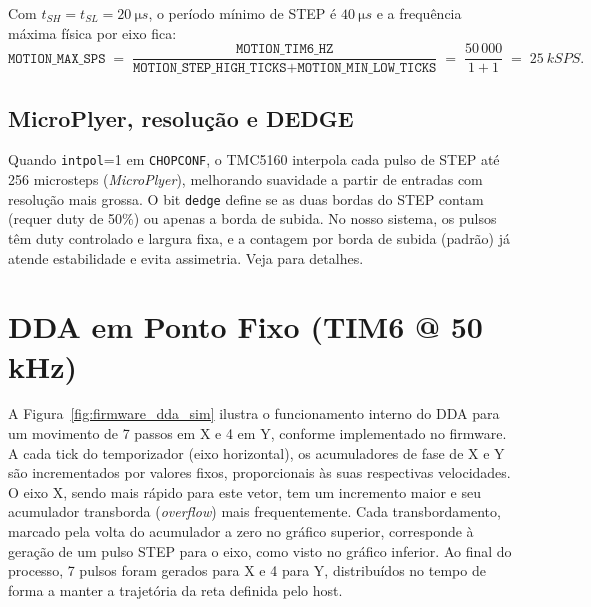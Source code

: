 \noindent
Com $t_{SH}=t_{SL}=\SI{20}{\micro s}$, o per\'iodo m\'inimo de STEP \'e $\SI{40}{\micro s}$ e a frequ\^encia m\'axima f\'isica por eixo fica:
\[
\texttt{MOTION\_MAX\_SPS} \;=\; 
\frac{\texttt{MOTION\_TIM6\_HZ}}{\texttt{MOTION\_STEP\_HIGH\_TICKS}+\texttt{MOTION\_MIN\_LOW\_TICKS}}
\;=\; \frac{50\,000}{1+1} \;=\; \SI{25}{kSPS}.
\]

\subsection{MicroPlyer, resolu\c{c}\~ao e DEDGE}
Quando \texttt{intpol}=1 em \texttt{CHOPCONF}, o TMC5160 interpola cada pulso de STEP at\'e 256 microsteps (\emph{MicroPlyer}), melhorando suavidade a partir de entradas com resolu\c{c}\~ao mais grossa. O bit \texttt{dedge} define se as duas bordas do STEP contam (requer duty de 50\%) ou apenas a borda de subida. No nosso sistema, os pulsos t\^em duty controlado e largura fixa, e a contagem por borda de subida (padr\~ao) j\'a atende estabilidade e evita assimetria. Veja \cite{tmc5160_ds} para detalhes.

\FloatBarrier
\section{DDA em Ponto Fixo (TIM6 @ 50\,kHz)}
\label{sec:dda}

A Figura~\ref{fig:firmware_dda_sim} ilustra o funcionamento interno do DDA para um movimento de 7 passos em X e 4 em Y, conforme implementado no firmware. A cada tick do temporizador (eixo horizontal), os acumuladores de fase de X e Y s\~ao incrementados por valores fixos, proporcionais \`as suas respectivas velocidades. O eixo X, sendo mais r\'apido para este vetor, tem um incremento maior e seu acumulador transborda (\emph{overflow}) mais frequentemente. Cada transbordamento, marcado pela volta do acumulador a zero no gr\'afico superior, corresponde \`a gera\c{c}\~ao de um pulso STEP para o eixo, como visto no gr\'afico inferior. Ao final do processo, 7 pulsos foram gerados para X e 4 para Y, distribu\'idos no tempo de forma a manter a trajet\'oria da reta definida pelo host.

